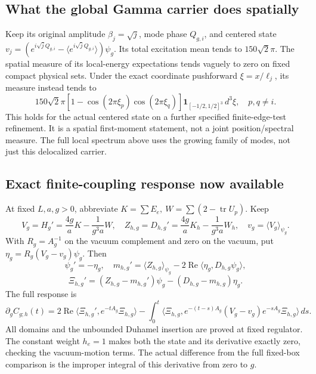 \documentclass[
  11pt,
]{article}
\begin{document}
\subsection{What the global Gamma carrier does
spatially}\label{weak-coupling-part-13-what-the-global-gamma-carrier-does-spatially}

Keep its original amplitude \(\beta_j=\sqrt j\), mode phase \(Q_{g,i}\),
and centered state
\(v_j=(e^{i\sqrt jQ_{g,i}}-\langle e^{i\sqrt jQ_{g,i}}\rangle)\psi_g\).
Its total excitation mean tends to \(150\sqrt2\pi\). The spatial measure
of its local-energy expectations tends vaguely to zero on fixed compact
physical sets. Under the exact coordinate pushforward \(\xi=x/\ell_j\),
its measure instead tends to \[
 150\sqrt2\pi
 [1-\cos(2\pi\xi_p)\cos(2\pi\xi_q)]
                 \mathbf1_{[-1/2,1/2]^3}\,d^3\xi,\quad p,q\ne i.
\] This holds for the actual centered state on a further specified
finite-edge-test refinement. It is a spatial first-moment statement, not
a joint position/spectral measure. The full local spectrum above uses
the growing family of modes, not just this delocalized carrier.

\subsection{Exact finite-coupling response now
available}\label{weak-coupling-part-13-exact-finite-coupling-response-now-available}

At fixed \(L,a,g>0\), abbreviate
\(K=\sum E_e,\ W=\sum(2-\operatorname{tr}U_p)\). Keep \[
 V_g=H_g'=\frac{4g}{a}K-\frac1{g^3a}W,\quad
 Z_{h,g}=D_{h,g}'=\frac{4g}{a}K_h-\frac1{g^3a}W_h,\quad
 v_g=\langle V_g\rangle_{\psi_g}.
\] With \(R_g=A_g^{-1}\) on the vacuum complement and zero on the
vacuum, put \(\eta_g=R_g(V_g-v_g)\psi_g\). Then \[
 \psi_g'=-\eta_g,\quad
 m_{h,g}'=\langle Z_{h,g}\rangle_{\psi_g}
                   -2\operatorname{Re}\langle\eta_g,D_{h,g}\psi_g\rangle,
\] \[
 \Xi_{h,g}'=(Z_{h,g}-m_{h,g}')\psi_g
                          -(D_{h,g}-m_{h,g})\eta_g .
\] The full response is \[
 \partial_g C_{g;h}(t)=
 2\operatorname{Re}\langle\Xi_{h,g}',e^{-tA_g}\Xi_{h,g}\rangle
 -\int_0^t\langle\Xi_{h,g},e^{-(t-s)A_g}
                    (V_g-v_g)e^{-sA_g}\Xi_{h,g}\rangle\,ds .
\] All domains and the unbounded Duhamel insertion are proved at fixed
regulator. The constant weight \(h_e=1\) makes both the state and its
derivative exactly zero, checking the vacuum-motion terms. The actual
difference from the full fixed-box comparison is the improper integral
of this derivative from zero to \(g\).
\end{document}

